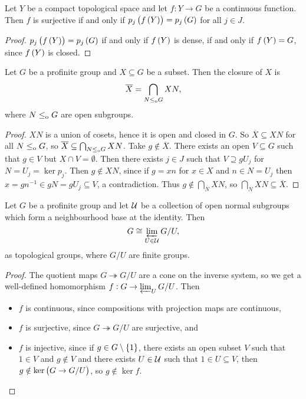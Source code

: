 \begin{corollary}
\label{cor:1.2.31}
Let $ Y $ be a compact topological space and let $ f : Y \to G $ be a continuous function. Then $ f $ is surjective if and only if $ p_j\br{f\br{Y}} = p_j\br{G} $ for all $ j \in J $.
\end{corollary}

\begin{proof}
$ p_j\br{f\br{Y}} = p_j\br{G} $ if and only if $ f\br{Y} $ is dense, if and only if $ f\br{Y} = G $, since $ f\br{Y} $ is closed.
\end{proof}

\pagebreak

\begin{proposition}
Let $ G $ be a profinite group and $ X \subseteq G $ be a subset. Then the closure of $ X $ is
$$ \overline{X} = \bigcap_{N \le_{\mathrm{o}} G} XN, $$
where $ N \le_{\mathrm{o}} G $ are open subgroups.
\end{proposition}

\begin{proof}
$ XN $ is a union of cosets, hence it is open and closed in $ G $. So $ \overline{X} \subseteq XN $ for all $ N \le_{\mathrm{o}} G $, so $ \overline{X} \subseteq \bigcap_{N \le_{\mathrm{o}} G} XN $. Take $ g \notin \overline{X} $. There exists an open $ V \subseteq G $ such that $ g \in V $ but $ X \cap V = \emptyset $. Then there exists $ j \in J $ such that $ V \supseteq gU_j $ for $ N = U_j = \ker p_j $. Then $ g \notin XN $, since if $ g = xn $ for $ x \in X $ and $ n \in N = U_j $ then $ x = gn^{-1} \in gN = gU_j \subseteq V $, a contradiction. Thus $ g \notin \bigcap_N XN $, so $ \bigcap_N XN \subseteq \overline{X} $.
\end{proof}

\begin{proposition}
\label{prop:1.2.33}
Let $ G $ be a profinite group and let $ \mathcal{U} $ be a collection of open normal subgroups which form a neighbourhood base at the identity. Then
$$ G \cong \varprojlim_{U \in \mathcal{U}} G / U, $$
as topological groups, where $ G / U $ are finite groups.
\end{proposition}

\begin{proof}
The quotient maps $ G \twoheadrightarrow G / U $ are a cone on the inverse system, so we get a well-defined homomorphism $ f : G \to \varprojlim_U G / U $. Then
\begin{itemize}
\item $ f $ is continuous, since compositions with projection maps are continuous,
\item $ f $ is surjective, since $ G \twoheadrightarrow G / U $ are surjective, and
\item $ f $ is injective, since if $ g \in G \setminus \cbr{1} $, there exists an open subset $ V $ such that $ 1 \in V $ and $ g \notin V $ and there exists $ U \in \mathcal{U} $ such that $ 1 \in U \subseteq V $, then $ g \notin \ker \br{G \to G / U} $, so $ g \notin \ker f $.
\end{itemize}
\end{proof}

